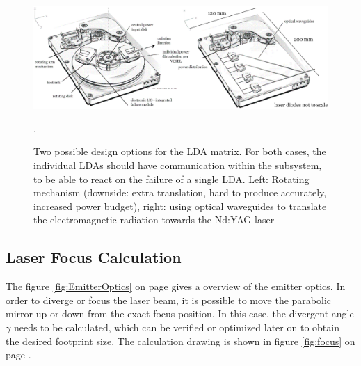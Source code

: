 \begin{figure}[ht!]
\centering
\includegraphics[scale=0.4]{chapters/img/Diode_laser.png} 
\caption[Two possible design options for the \acs{LDA} matrix]{Two possible design options for the \acs{LDA} matrix. For both cases, the individual \acp{LDA} should have communication within the subsystem, to be able to react on the failure of a single \acs{LDA}. Left: Rotating mechanism (downside: extra translation, hard to produce accurately, increased power budget), right: using optical waveguides to translate the electromagnetic radiation towards the Nd:YAG \acs{laser}}.
\label{fig:laser_design_option}
\end{figure}


\subsection{Laser Focus Calculation}
\label{focus}
The figure \ref{fig:EmitterOptics} on page \pageref{fig:EmitterOptics} gives a overview of the emitter optics. In order to diverge or focus the laser beam, it is possible to move the parabolic mirror up or down from the exact focus position. In this case, the divergent angle $\gamma$ needs to be calculated, which can be verified or optimized later on to obtain the desired footprint size. The calculation drawing is shown in figure \ref{fig:focus} on page \pageref{fig:focus}.


